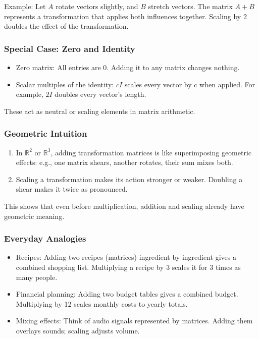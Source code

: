 \documentclass[
  letterpaper,
  DIV=11,
  numbers=noendperiod]{scrreprt}
\providecommand{\tightlist}{%
  \setlength{\itemsep}{0pt}\setlength{\parskip}{0pt}}
\begin{document}
Example: Let \(A\) rotate vectors slightly, and \(B\) stretch vectors.
The matrix \(A + B\) represents a transformation that applies both
influences together. Scaling by 2 doubles the effect of the
transformation.

\subsubsection{Special Case: Zero and
Identity}\label{special-case-zero-and-identity}

\begin{itemize}
\tightlist
\item
  Zero matrix: All entries are 0. Adding it to any matrix changes
  nothing.
\item
  Scalar multiples of the identity: \(cI\) scales every vector by c when
  applied. For example, \(2I\) doubles every vector's length.
\end{itemize}

These act as neutral or scaling elements in matrix arithmetic.

\subsubsection{Geometric Intuition}\label{geometric-intuition-1}

\begin{enumerate}
\def\labelenumi{\arabic{enumi}.}
\tightlist
\item
  In \(\mathbb{R}^2\) or \(\mathbb{R}^3\), adding transformation
  matrices is like superimposing geometric effects: e.g., one matrix
  shears, another rotates, their sum mixes both.
\item
  Scaling a transformation makes its action stronger or weaker. Doubling
  a shear makes it twice as pronounced.
\end{enumerate}

This shows that even before multiplication, addition and scaling already
have geometric meaning.

\subsubsection{Everyday Analogies}\label{everyday-analogies-9}

\begin{itemize}
\tightlist
\item
  Recipes: Adding two recipes (matrices) ingredient by ingredient gives
  a combined shopping list. Multiplying a recipe by 3 scales it for 3
  times as many people.
\item
  Financial planning: Adding two budget tables gives a combined budget.
  Multiplying by 12 scales monthly costs to yearly totals.
\item
  Mixing effects: Think of audio signals represented by matrices. Adding
  them overlays sounds; scaling adjusts volume.
\end{itemize}
\end{document}
